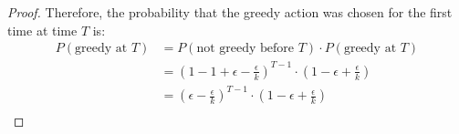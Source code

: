 \documentclass{article}
\begin{document}
\begin{enumerate}[a)]
\begin{enumerate}[i)]
\begin{proof}
            Therefore, the probability that the greedy action was chosen for the first time at time $T$ is:
            \begin{equation*}
                \begin{aligned}
                    P(\text{greedy at } T) &= P(\text{not greedy before } T) \cdot P(\text{greedy at } T)\\
                    &= \left(1 - 1 + \epsilon - \frac{\epsilon}{k}\right)^{T - 1} \cdot \left(1 - \epsilon + \frac{\epsilon}{k}\right)\\
                    &= \left(\epsilon - \frac{\epsilon}{k}\right)^{T - 1} \cdot \left(1 - \epsilon + \frac{\epsilon}{k}\right)\\
                \end{aligned}
            \end{equation*}\par
        \end{proof}


\end{enumerate}
\end{enumerate}
\end{document}
